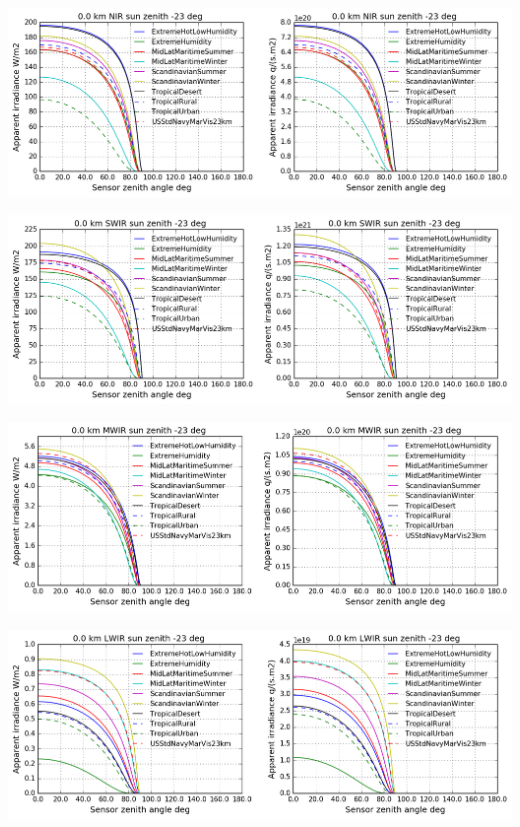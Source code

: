 \documentclass{workpackage}
\begin{document}
\begin{center}
\includegraphics{./pic/Analyse-Standard-Atmospheres_40_1.png}
\end{center}

\begin{center}
\includegraphics{./pic/Analyse-Standard-Atmospheres_40_2.png}
\end{center}

\begin{center}
\includegraphics{./pic/Analyse-Standard-Atmospheres_40_3.png}
\end{center}

\begin{center}
\includegraphics{./pic/Analyse-Standard-Atmospheres_40_4.png}
\end{center}
\end{document}
